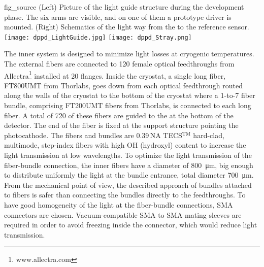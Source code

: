 \begin{dunefigure}{fig_source}
{(Left) Picture of the light guide structure during the development phase. The six arms are visible, and on one of them a prototype  driver is mounted. (Right) Schematics of the light way from the  to the reference sensor.}
\texttt{[image: dppd\_LightGuide.jpg]}
\texttt{[image: dppd\_Stray.png]}
\end{dunefigure}





The inner system is designed to minimize light losses at cryogenic temperatures. The external fibers are connected to 120 female optical feedthroughs from Allectra\footnote{www.allectra.com} installed at \num{20} flanges. Inside the cryostat, a single long fiber, FT800UMT from Thorlabs, goes down from each optical feedthrough routed along the walls of the cryostat to the bottom of the cryostat where a \num{1}-to-\num{7} fiber bundle, comprising FT200UMT fibers from Thorlabs, is connected to each long fiber. A total of \num{720} of these fibers are guided to the  at the bottom of the detector. The end of the fiber is fixed at the  support structure pointing the photocathode. The fibers and bundles are \num{0.39}\,NA TECS$^\text{TM}$ hard-clad, multimode, step-index fibers with high OH (hydroxyl) content to increase the light transmission at low wavelengths. To optimize the light transmission of the fiber-bundle connection, the inner fibers have a diameter of \SI{800}{\um}, big enough to distribute uniformly the light at the bundle entrance, total diameter \SI{700}{\um}.  From the mechanical point of view, the described approach of bundles attached to fibers is safer than connecting  the bundles directly to the feedthroughs. To have good homogeneity of the light at the fiber-bundle connections, SMA connectors are chosen. Vacuum-compatible SMA to SMA mating sleeves are required in order to avoid  freezing inside the connector, which would reduce light transmission.

